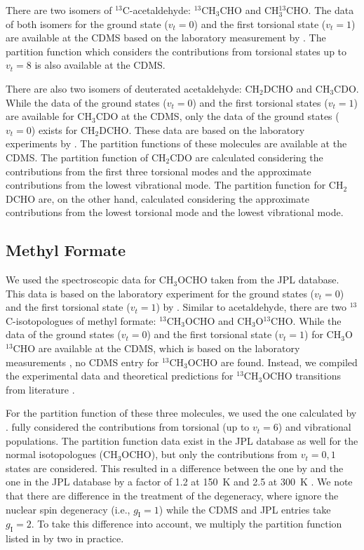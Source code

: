 \documentclass[linenumbers, twocolumn, twocolappendix, astrosymb, times]{aastex631}
\newcommand{\methylformate}{CH$_3$OCHO\xspace}
\begin{document}
There are two isomers of $^{13}$C-acetaldehyde: $^{13}$CH$_3$CHO and CH$_3^{13}$CHO. The data of both isomers for the ground state ($v_t = 0$) and the first torsional state ($v_t = 1$) are available at the CDMS based on the laboratory measurement by \citep{Margules2015}. The partition function which considers the contributions from torsional states up to $v_t = 8$ is also available at the CDMS.

There are also two isomers of deuterated acetaldehyde: CH$_2$DCHO and CH$_3$CDO. While the data of the ground states ($v_t = 0$) and the first torsional states ($v_t = 1$) are available for CH$_3$CDO at the CDMS, only the data of the ground states ($v_t = 0$) exists for CH$_2$DCHO. These data are based on the laboratory experiments by \citet{Coudert2019}. The partition functions of these molecules are available at the CDMS. The partition function of CH$_2$CDO are calculated considering the contributions from the first three torsional modes and the approximate contributions from the lowest vibrational mode. The partition function for CH$_2$DCHO are, on the other hand, calculated considering the approximate contributions from the lowest torsional mode and the lowest vibrational mode.


\subsection{Methyl Formate}
We used the spectroscopic data for \methylformate taken from the JPL database. This data is based on the laboratory experiment for the ground states ($v_t = 0$) and the first torsional state ($v_t = 1$) by \citet{Ilyushin2009}. Similar to acetaldehyde, there are two $^{13}$C-isotopologues of methyl formate: $^{13}$CH$_3$OCHO and CH$_3$O$^{13}$CHO. While the data of the ground states ($v_t = 0$) and the first torsional state ($v_t = 1$) for CH$_3$O$^{13}$CHO are available at the CDMS, which is based on the laboratory measurements \citep[][and references therein]{Carvajal2010}, no CDMS entry for $^{13}$CH$_3$OCHO are found. Instead, we compiled the experimental data and theoretical predictions for $^{13}$CH$_3$OCHO transitions from literature \citep{Carvajal2009, Haykal2014, Favre2014}. 

For the partition function of these three molecules, we used the one calculated by \citet{Favre2014}. \citet{Favre2014} fully considered the contributions from torsional (up to $v_t=6$) and vibrational populations. The partition function data exist in the JPL database as well for the normal isotopologues (\methylformate), but only the contributions from $v_t = 0, 1$ states are considered. This resulted in a difference between the one by \citet{Favre2014} and the one in the JPL database by a factor of 1.2 at 150~K and 2.5 at 300~K \citep{Favre2014}. We note that there are difference in the treatment of the degeneracy, where \citet{Favre2014} ignore the nuclear spin degeneracy (i.e., $g_\mathrm{I} = 1$) while the CDMS and JPL entries take $g_\mathrm{I} = 2$. To take this difference into account, we multiply the partition function listed in \citet{Favre2014} by two in practice.
\end{document}
